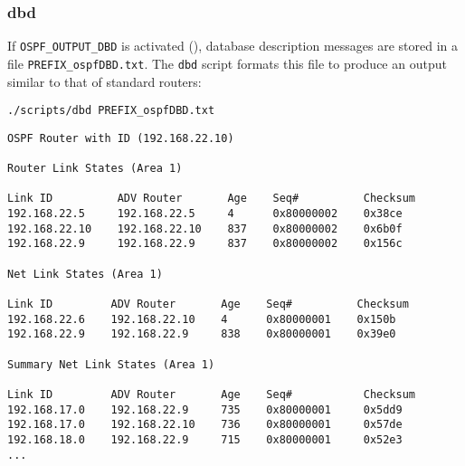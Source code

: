 \documentclass[documentation]{subfiles}
\begin{document}
\subsubsection{dbd}
If {\tt OSPF\_OUTPUT\_DBD} is activated (), database description messages are stored in a file {\tt PREFIX\_ospfDBD.txt}. The {\tt dbd} script formats this file to produce an output similar to that of standard routers:
\begin{center}
    {\tt ./scripts/dbd PREFIX\_ospfDBD.txt}
\end{center}

\begin{lstlisting}
OSPF Router with ID (192.168.22.10)

Router Link States (Area 1)

Link ID          ADV Router       Age    Seq#          Checksum
192.168.22.5     192.168.22.5     4      0x80000002    0x38ce
192.168.22.10    192.168.22.10    837    0x80000002    0x6b0f
192.168.22.9     192.168.22.9     837    0x80000002    0x156c

Net Link States (Area 1)

Link ID         ADV Router       Age    Seq#          Checksum
192.168.22.6    192.168.22.10    4      0x80000001    0x150b
192.168.22.9    192.168.22.9     838    0x80000001    0x39e0

Summary Net Link States (Area 1)

Link ID         ADV Router       Age    Seq#           Checksum
192.168.17.0    192.168.22.9     735    0x80000001     0x5dd9
192.168.17.0    192.168.22.10    736    0x80000001     0x57de
192.168.18.0    192.168.22.9     715    0x80000001     0x52e3
...
\end{lstlisting}
\end{document}

